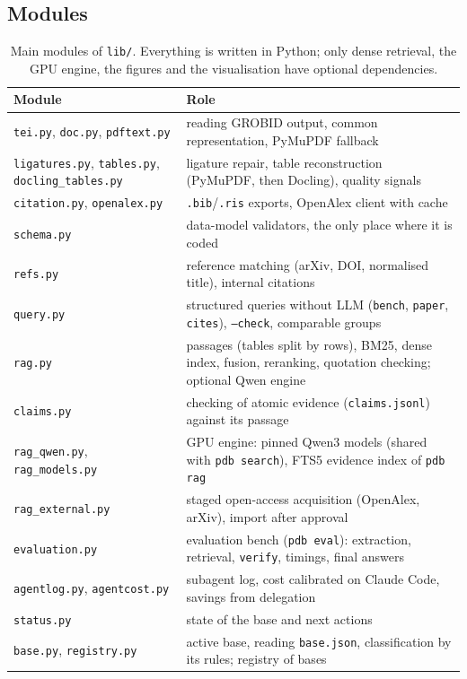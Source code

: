 \documentclass[11pt,a4paper]{article}
\newcommand{\cmd}[1]{\texttt{#1}}
\begin{document}
\subsection{Modules}

\begin{table}[ht]
\centering
\caption{Main modules of \cmd{lib/}. Everything is written in Python; only dense retrieval,
the GPU engine, the figures and the visualisation have optional dependencies.}
\label{tab:modules}
\small
\begin{tabularx}{\linewidth}{@{}lL@{}}
\toprule
Module & Role \\
\midrule
\cmd{tei.py}, \cmd{doc.py}, \cmd{pdftext.py} & reading GROBID output, common representation, PyMuPDF fallback \\
\cmd{ligatures.py}, \cmd{tables.py}, \cmd{docling\_tables.py} & ligature repair, table reconstruction (PyMuPDF, then Docling), quality signals \\
\cmd{citation.py}, \cmd{openalex.py} & \cmd{.bib}/\cmd{.ris} exports, OpenAlex client with cache \\
\cmd{schema.py} & data-model validators, the only place where it is coded \\
\cmd{refs.py} & reference matching (arXiv, DOI, normalised title), internal citations \\
\cmd{query.py} & structured queries without LLM (\cmd{bench}, \cmd{paper}, \cmd{cites}), \cmd{--check}, comparable groups \\
\cmd{rag.py} & passages (tables split by rows), BM25, dense index, fusion, reranking, quotation checking; optional Qwen engine \\
\cmd{claims.py} & checking of atomic evidence (\cmd{claims.jsonl}) against its passage \\
\cmd{rag\_qwen.py}, \cmd{rag\_models.py} & GPU engine: pinned Qwen3 models (shared with \cmd{pdb search}), FTS5 evidence index of \cmd{pdb rag} \\
\cmd{rag\_external.py} & staged open-access acquisition (OpenAlex, arXiv), import after approval \\
\cmd{evaluation.py} & evaluation bench (\cmd{pdb eval}): extraction, retrieval, \cmd{verify}, timings, final answers \\
\cmd{agentlog.py}, \cmd{agentcost.py} & subagent log, cost calibrated on Claude Code, savings from delegation \\
\cmd{status.py} & state of the base and next actions \\
\cmd{base.py}, \cmd{registry.py} & active base, reading \cmd{base.json}, classification by its rules; registry of bases \\

\end{tabularx}
\end{table}
\end{document}
